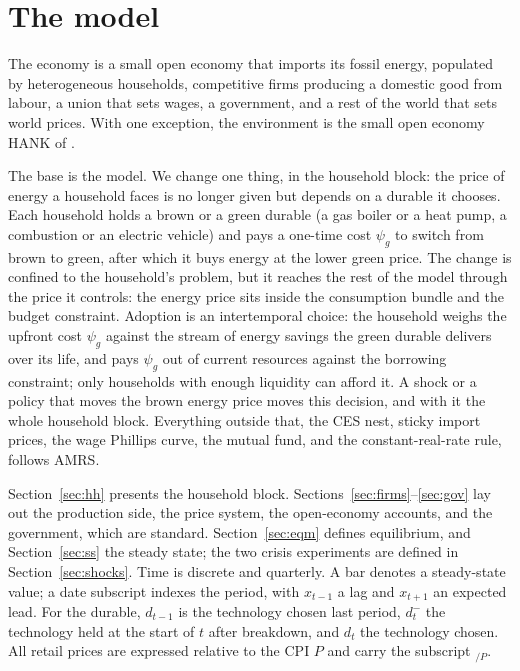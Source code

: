\section{The model}\label{sec:model}

The economy is a small open economy that imports its fossil energy, populated
by heterogeneous households, competitive firms producing a domestic good from
labour, a union that sets wages, a government, and a rest of the world that sets
world prices. With one exception, the environment is the small open economy HANK of
\citet{auclert2023energy}.

The base is the \citet{auclert2023energy} model. We change one thing, in the household
block: the price of energy a household faces is no longer given but depends on a
durable it chooses. Each household holds a brown or a green durable (a gas boiler
or a heat pump, a combustion or an electric vehicle) and pays a one-time cost
$\psi_g$ to switch from brown to green, after which it buys energy at the lower
green price. The change is confined to the household's problem, but it reaches the
rest of the model through the price it controls: the energy price sits inside the
consumption bundle and the budget constraint. Adoption is an intertemporal choice:
the household weighs the upfront cost $\psi_g$ against the stream of energy savings
the green durable delivers over its life, and pays $\psi_g$ out of current resources
against the borrowing constraint; only households with enough liquidity can afford
it. A shock or a policy that moves the brown energy price moves this decision, and
with it the whole household block. Everything outside that, the CES nest, sticky
import prices, the wage Phillips curve, the mutual fund, and the
constant-real-rate rule, follows AMRS.

Section~\ref{sec:hh} presents the household block.
Sections~\ref{sec:firms}--\ref{sec:gov} lay out the production side, the price
system, the open-economy accounts, and the government, which are standard.
Section~\ref{sec:eqm} defines equilibrium, and Section~\ref{sec:ss} the steady
state; the two crisis experiments are defined in Section~\ref{sec:shocks}. Time is discrete and quarterly. A bar denotes
a steady-state value; a date subscript indexes the period, with $x_{t-1}$ a lag and
$x_{t+1}$ an expected lead. For the durable, $d_{t-1}$ is the technology chosen last period, $d^-_t$ the
technology held at the start of $t$ after breakdown, and $d_t$ the technology chosen. All retail
prices are expressed relative to the CPI $P$ and carry the subscript ${}_{/P}$.

